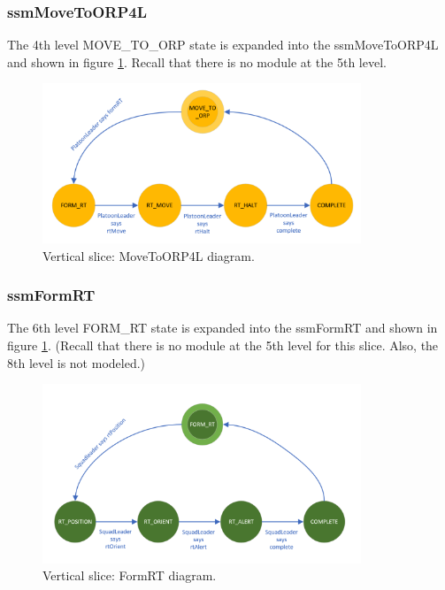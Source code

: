 \documentclass[../../main/main.tex]{subfiles}
\begin{document}
\subsubsection{ssmMoveToORP4L}\label{sssec:ssmMoveToORP4L}
The 4th level MOVE_TO_ORP state is expanded into the ssmMoveToORP4L  and shown in figure \ref{moveToORP4LDiagram}.  Recall that there is no module at the 5th level.  

\begin{figure}[h!]
\centering
\includegraphics[width=0.85\textwidth]{../figures/moveToORP4LDiagram}
\caption{\label{moveToORP4LDiagram} Vertical slice: MoveToORP4L diagram.}
\end{figure}
\clearpage

\subsubsection{ssmFormRT}\label{sssec:ssmFormRT}
The 6th level FORM_RT state is expanded into the ssmFormRT  and shown in figure \ref{moveToORP4LDiagram}.  (Recall that there is no module at the 5th level for this slice.  Also, the 8th level is not modeled.)

\begin{figure}[h!]
\centering
\includegraphics[width=0.85\textwidth]{../figures/ssmFormRTDiagram}
\caption{\label{ssmFormRTDiagram} Vertical slice: FormRT diagram.}
\end{figure}
\clearpage
\end{document}
